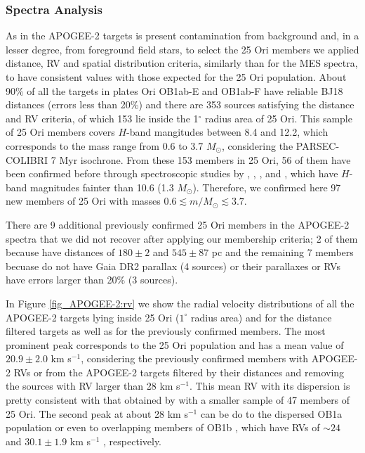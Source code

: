 \documentclass[12pt]{article}
\newcounter{subsubsubsection}[subsubsection]
\begin{document}
\subsubsection{Spectra Analysis}
\label{sec_APOGEE-2:analysis}

\label{sec_APOGEE-2:memberships}
As in the APOGEE-2 targets is present contamination from background and, in a lesser degree, from foreground field stars, to select the 25 Ori members we applied distance, RV and spatial distribution criteria, similarly than for the MES spectra, to have consistent values with those expected for the 25 Ori population. About 90\% of all the targets in plates Ori OB1ab-E and OB1ab-F have reliable BJ18 distances (errors less than 20\%) and there are 353 sources satisfying the distance and RV criteria, of which 153 lie inside the 1$^\circ$ radius area of 25 Ori. This sample of 25 Ori members covers $H$-band mangitudes between 8.4 and 12.2, which corresponds to the mass range from 0.6 to 3.7 $M_\odot$, considering the PARSEC-COLIBRI 7 Myr isochrone. From these 153 members in 25 Ori, 56 of them have been confirmed before through spectroscopic studies by \citet[18 sources; ][]{Briceno2005}, \citet[9 sources; ][]{Briceno2007}, \citet[8 sources; ][]{Downes2014}, \citet[3 sources; ][]{Suarez2017} and \citet[18 sources; ][]{Briceno2018}, which have $H$-band magnitudes fainter than 10.6 (1.3 $M_\odot$). Therefore, we confirmed here 97 new members of 25 Ori with masses $0.6\lesssim m/M_\odot \lesssim 3.7$.

There are 9 additional previously confirmed 25 Ori members in the APOGEE-2 spectra that we did not recover after applying our membership criteria; 2 of them because have distances of $180\pm2$ and $545\pm87$ pc and the remaining 7 members becuase do not have Gaia DR2 parallax (4 sources) or their parallaxes or RVs have errors larger than 20\% (3 sources).

In Figure \ref{fig_APOGEE-2:rv} we show the radial velocity distributions of all the APOGEE-2 targets lying inside 25 Ori ($1^\circ$ radius area) and for the distance filtered targets as well as for the previously confirmed members. The most prominent peak corresponds to the 25 Ori population and has a mean value of $20.9\pm2.0$ km s$^{-1}$, considering the previously confirmed members with APOGEE-2 RVs or from the APOGEE-2 targets filtered by their distances and removing the sources with RV larger than 28 km s$^{-1}$. This mean RV with its dispersion is pretty consistent with that obtained by \citet[$19.7\pm1.7$ km s$^{-1}$; ][ and references therein]{Briceno2007} with a smaller sample of 47 members of 25 Ori. The second peak at about 28 km s$^{-1}$ can be do to the dispersed OB1a population or even to overlapping members of OB1b \citep[Orion C and D; ][]{Kounkel2018}, which have RVs of $\sim24$ \citep{Jeffries2006} and $30.1\pm1.9$ km s$^{-1}$ \citep{Briceno2007}, respectively.
\end{document}
